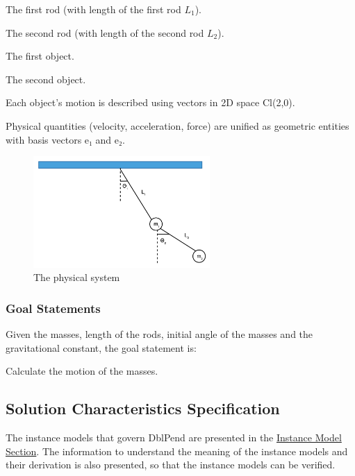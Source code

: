 \documentclass[12pt]{article}
\begin{document}
{\begin{description}[font=\normalfont]
\item[PS1:]{The first rod (with length of the first rod ${L_{1}}$).}
\item[PS2:]{The second rod (with length of the second rod ${L_{2}}$).}
\item[PS3:]{The first object.}
\item[PS4:]{The second object.}
\item[PS5:]{Each object's motion is described using vectors in 2D space Cl(2,0).}
\item[PS6:]{Physical quantities (velocity, acceleration, force) are unified as geometric entities with basis vectors e₁ and e₂.}
\end{description}
\begin{figure}[H]
\begin{center}
\includegraphics[width=0.6\textwidth]{../../../../datafiles/dblpend/dblpend.png}
\caption{The physical system}
\label{Figure:dblpend}
\end{center}
\end{figure}
\subsubsection{Goal Statements}
\label{Sec:GoalStmt}
Given the masses, length of the rods, initial angle of the masses and the gravitational constant, the goal statement is:

\begin{description}[font=\normalfont]
\item[motionMass:\phantomsection\label{motionMass}]{Calculate the motion of the masses.}
\end{description}
\subsection{Solution Characteristics Specification}
\label{Sec:SolCharSpec}
The instance models that govern DblPend are presented in the \hyperref[Sec:IMs]{Instance Model Section}. The information to understand the meaning of the instance models and their derivation is also presented, so that the instance models can be verified.

}
\end{document}
